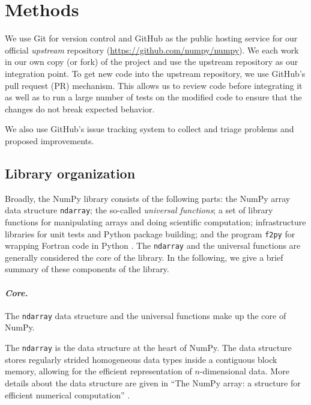 \documentclass[twocolumn]{article}
\begin{document}
\newpage

\section*{Methods}

We use Git for version control and GitHub as the public hosting service for our
official \emph{upstream} repository (\url{https://github.com/numpy/numpy}).
We each work in our own copy (or fork) of the project and use the
upstream repository as our integration point.
To get new code into the upstream repository, we use GitHub's
pull request (PR) mechanism.
This allows us to review code before integrating it as well as to run a
large number of tests on the modified code to ensure that the changes
do not break expected behavior.

We also use GitHub's issue tracking system to collect and triage problems and
proposed improvements.


\subsection*{Library organization}

Broadly, the NumPy library consists of the following parts:
the NumPy array data structure \texttt{ndarray}; the so-called \emph{universal functions};
a set of library functions for manipulating arrays and doing scientific
computation; infrastructure libraries for unit tests and Python package
building; and the program \texttt{f2py} for wrapping Fortran code in Python \cite{peterson2009f2py}.
The \texttt{ndarray} and the universal functions are generally considered
the core of the library.
In the following, we give a brief summary of these components of the
library.

\paragraph{\emph{Core.}}  The \texttt{ndarray} data structure and the
universal functions make up the core of NumPy.

The \texttt{ndarray} is the data structure at the heart of NumPy.
The data structure stores regularly strided homogeneous data types
inside a contiguous block memory, allowing for the efficient representation
of $n$-dimensional data.
More details about the data structure are given in ``The NumPy array:
a structure for efficient numerical computation'' \cite{vanderwalt2011numpy}.
\end{document}
